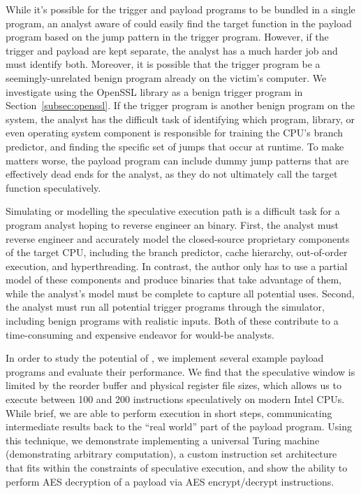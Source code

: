 While it's possible for the trigger and payload programs to be bundled in a
single program, an analyst aware of \speculake could easily find the target
function in the payload program based on the jump pattern in the trigger program.
However, if the trigger and payload are kept separate, the analyst has a much
harder job and must identify both.
Moreover, it is possible that the trigger program be a
seemingly-unrelated benign program already on the victim's computer. We
investigate using the OpenSSL library as a benign trigger
program in Section~\ref{subsec:openssl}. If the trigger program is another benign
program on the system, the analyst has the difficult task of identifying which
program, library, or even operating system component is responsible for training
the CPU's branch predictor, and finding the specific set of jumps that occur at
runtime. To make matters worse, the payload program can include dummy jump
patterns that are effectively dead ends for the analyst, as they do not
ultimately call the target function speculatively.


Simulating or modelling the speculative execution path is a difficult task for a
program analyst hoping to reverse engineer an \speculake binary. First, the
analyst must reverse engineer and accurately model the closed-source proprietary
components of the target CPU, including the branch predictor, cache hierarchy,
out-of-order execution, and hyperthreading. In contrast, the \speculake
author only has to use a partial model of these components and produce binaries
that take advantage of them, while the analyst's model must be complete to
capture all potential \speculake uses. Second, the analyst must run all
potential trigger programs through the simulator, including benign programs with
realistic inputs. Both of these contribute to a time-consuming and expensive
endeavor for would-be analysts.

In order to study the potential of \speculake, we implement several example
payload programs and evaluate their performance.
We find that the speculative window is limited by the reorder buffer
and physical register file sizes, which allows us to execute between 100 and 200 instructions
speculatively on modern Intel CPUs. While brief, we are able to perform
execution in short steps, communicating intermediate results back to the ``real
world'' part of the payload program. Using this technique,
we demonstrate implementing a universal Turing machine
(demonstrating arbitrary computation), a custom instruction set architecture
that fits within the constraints of speculative execution, and show
the ability to perform AES decryption
of a payload via AES encrypt/decrypt instructions.

